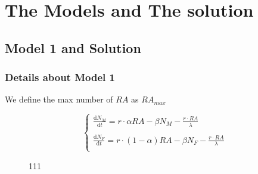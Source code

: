 \documentclass[12pt]{article}  %
\begin{document}
\section{The Models and The solution}

\subsection{Model 1 and Solution}
\subsubsection{Details about Model 1}
We define the max number of $RA$ as $RA_{max}$

\begin{equation}\label{eq:4-1}
\begin{cases}
	\frac{\mathrm{d}N_{M}}{\mathrm{d}t}=r \cdot \alpha RA-\beta N_{M}-\frac{r\cdot RA}{\lambda} \\
	\\
	\frac{\mathrm{d}N_{F}}{\mathrm{d}t}=r \cdot(1 - \alpha )RA-\beta N_{F}-\frac{r\cdot RA}{\lambda} \\
\end{cases}
\end{equation}











\begin{figure}[htbp]
	\centering
	\quad    %
	\quad
	\quad
	\quad
	\quad
	\quad
	\caption{111}
\end{figure}
\end{document}
